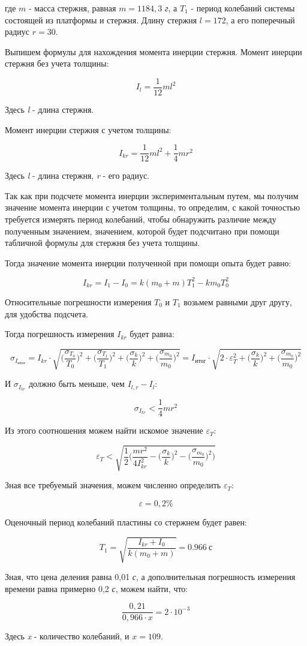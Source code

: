 \documentclass[12pt,a4paper]{article}
\begin{document}
где $m$ - масса стержня, равная $m = 1184,3$ \textit{г}, а $T_1$ - период колебаний системы состоящей из платформы и стержня. Длину стержня $l = 172$, а его поперечный радиус $r = 30$.

Выпишем формулы для нахождения момента инерции стержня. Момент инерции стержня без учета толщины:

\[I_l = \frac{1}{12}ml^2\]

Здесь \textit{l} - длина стержня.

Момент инерции стержня с учетом толщины:

\[I_{kr} = \frac{1}{12}ml^2 + \frac{1}{4}mr^2\]

Здесь \textit{l} - длина стержня, \textit{r} - его радиус.

Так как при подсчете момента инерции экспериментальным путем, мы получим значение момента инерции с учетом толщины, то определим, с какой точностью требуется измерять период колебаний, чтобы обнаружить различие между полученным значением, значением, которой будет подсчитано при помощи табличной формулы для стержня без учета толщины.

Тогда значение момента инерции полученной при помощи опыта будет равно:

\[I_{kr} = I_1 - I_0 = k(m_0 + m) T_1^2 - k m_0 T_0^2\]

Относительные погрешности измерения $T_0$ и $T_1$ возьмем равными друг другу, для удобства подсчета.

Тогда погрешность измерения $I_{kr}$ будет равна:

\[\sigma_{I_{\textit{итог}}} = I_{kr} \cdot \sqrt{\Big(\frac{\sigma_{T_0}}{T_0}\Big)^2 + \Big(\frac{\sigma_{T_1}}{T_1}\Big)^2 + \Big(\frac{\sigma_k}{k}\Big)^2 + \Big(\frac{\sigma_{m_0}}{m_0}\Big)^2} = I_{\textit{итог}} \cdot \sqrt{2 \cdot \varepsilon_T^2 + \Big(\frac{\sigma_k}{k}\Big)^2 + \Big(\frac{\sigma_{m_0}}{m_0}\Big)^2}\]

И $\sigma_{I_{kr}}$ должно быть меньше, чем $I_{l,r} - I_l$:

\[\sigma_{I_{kr}} < \frac{1}{4}mr^2\]

Из этого соотношения можем найти искомое значение $\varepsilon_T$:

\[\varepsilon_T < \sqrt{\frac{1}{2}\Big(\frac{mr^2}{4I_{kr}^2} - \Big(\frac{\sigma_k}{k}\Big)^2 - \Big(\frac{\sigma_{m_0}}{m_0}\Big)^2\Big)}\]

Зная все требуемый значения, можем численно определить $\varepsilon_T$:

\[\varepsilon = 0,2\%\]

Оценочный период колебаний пластины со стержнем будет равен:

\[T_1 = \sqrt{\frac{I_{kr} + I_0}{k(m_0 + m)}} = 0.966 \: \textit{с}\]

Зная, что цена деления равна 0,01 \textit{с}, а дополнительная погрешность измерения времени равна примерно 0,2 \textit{с}, можем найти, что:

\[\frac{0,21}{0,966 \cdot x} = 2 \cdot 10^{-3}\]

Здесь \textit{x} - количество колебаний, и $x = 109$.
\end{document}
